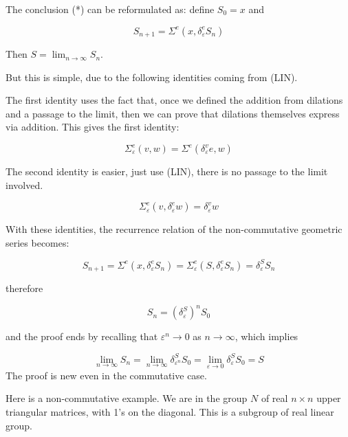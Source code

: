 \documentclass{article}
\begin{document}
The conclusion (*) can be reformulated as: define $S_{0} = x$ and 



$$ S_{n+1} = \Sigma^{e}(x, \delta^{e}_{\varepsilon} S_{n})$$



Then $S =\lim_{n \rightarrow \infty} S_{n}$. 



But this is simple, due to the following identities coming from (LIN).



The first identity uses the fact that, once we defined the addition from dilations and a passage to the limit, then we can prove that dilations themselves express via addition. This gives the first identity: 



$$ \Sigma^{e}_{\varepsilon}(v,w) = \Sigma^{e}(\delta^{v}_{\varepsilon} e, w)$$



The second identity is easier, just use (LIN), there is no passage to the limit involved.



$$ \Sigma^{e}_{\varepsilon}(v, \delta^{e}_{\varepsilon} w)  = \delta^{v}_{\varepsilon} w $$



With these identities, the recurrence relation of the non-commutative geometric series becomes: 



$$ S_{n+1} = \Sigma^{e}(x, \delta^{e}_{\varepsilon} S_{n}) = \Sigma^{e}_{\varepsilon}(S, \delta^{e}_{\varepsilon} S_{n}) = \delta^{S}_{\varepsilon} S_{n}$$



therefore 



$$ S_{n} = \left( \delta^{S}_{\varepsilon} \right)^{n} S_{0}$$



and the proof ends by recalling that $\varepsilon^{n} \rightarrow 0$ as $n \rightarrow \infty$, which implies 



$$ \lim_{n \rightarrow \infty} S_{n} = \lim_{n \rightarrow \infty} \delta^{S}_{\varepsilon^{n}} S_{0} = \lim_{\varepsilon \rightarrow 0} \delta^{S}_{\varepsilon} S_{0} = S$$
The proof is new even in the commutative case. 


Here is a non-commutative example. We are in the group $N$ of real $n \times n$ upper triangular matrices, with 1's on the diagonal. This is a subgroup of real linear group. 
\end{document}
